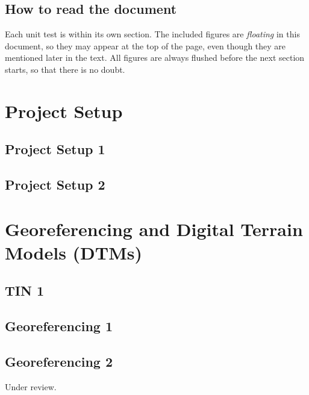 \documentclass{scrartcl}
\begin{document}
\subsection{How to read the document}

Each unit test is within its own section.
The included figures are \emph{floating} in this document, so they may appear at the top of the page,
 even though they are mentioned later in the text.
All figures are always flushed before the next section starts, so that there is no doubt.

\tableofcontents
\clearpage

\section{Project Setup}

\subsection{Project Setup 1}
\label{sec:project_setup_1}
\clearpage

\subsection{Project Setup 2}
\label{sec:project_setup_2}
\clearpage

\section{Georeferencing and Digital Terrain Models (DTMs)}

\subsection{TIN 1}
\label{sec:tin_1}
\clearpage

\subsection{Georeferencing 1}
\label{sec:georeferencing_1}
\clearpage

\subsection{Georeferencing 2}
\label{sec:georeferencing_2}
Under review.%
\clearpage
\end{document}
